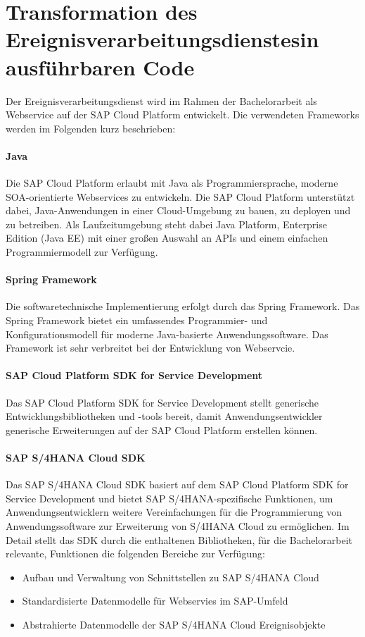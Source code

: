 \section{Transformation des Ereignisverarbeitungsdienstesin ausführbaren Code}\label{sec:Transformation}

Der Ereignisverarbeitungsdienst wird im Rahmen der Bachelorarbeit als Webservice auf der SAP Cloud Platform entwickelt. Die verwendeten Frameworks werden im Folgenden kurz beschrieben:

\paragraph{Java} Die SAP Cloud Platform erlaubt mit Java als Programmiersprache, moderne \ac{SOA}-orientierte Webservices zu entwickeln. Die SAP Cloud Platform unterstützt dabei, Java-Anwendungen in einer Cloud-Umgebung zu bauen, zu deployen und zu betreiben. Als Laufzeitumgebung steht dabei Java Platform, Enterprise Edition (Java EE) mit einer großen Auswahl an APIs und einem einfachen Programmiermodell zur Verfügung. \cite{Schneider.2018}

\paragraph{Spring Framework} Die softwaretechnische Implementierung erfolgt durch das Spring Framework. Das Spring Framework bietet ein umfassendes Programmier- und Konfigurationsmodell für moderne Java-basierte Anwendungssoftware. Das Framework ist sehr verbreitet bei der Entwicklung von Webservcie.
\cite{Herzig.2018}

\paragraph{SAP Cloud Platform SDK for Service Development} Das SAP Cloud Platform SDK for Service Development stellt generische Entwicklungsbibliotheken und -tools bereit, damit Anwendungsentwickler generische Erweiterungen auf der SAP Cloud Platform erstellen können.
\cite{Herzig.2018}

\paragraph{SAP S/4HANA Cloud SDK} Das SAP S/4HANA Cloud SDK basiert auf dem SAP Cloud Platform SDK for Service Development und bietet SAP S/4HANA-spezifische Funktionen, um Anwendungsentwicklern weitere Vereinfachungen für die Programmierung von Anwendungssoftware zur Erweiterung von  S/4HANA Cloud zu ermöglichen. \cite{Herzig.2018} 
Im Detail stellt das SDK durch die enthaltenen Bibliotheken, für die Bachelorarbeit relevante, Funktionen die folgenden Bereiche zur Verfügung:
\begin{itemize}
    \item Aufbau und Verwaltung von Schnittstellen zu SAP S/4HANA Cloud
    \item Standardisierte Datenmodelle für Webservies im SAP-Umfeld
    \item Abstrahierte Datenmodelle der SAP S/4HANA Cloud Ereignisobjekte
\end{itemize}

